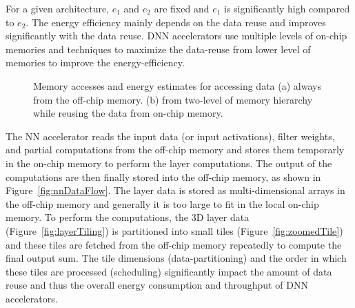 \documentclass[a4paper,10pt]{article}
\begin{document}
For a given architecture, $e_{1}$ and $e_{2}$ are fixed and $e_1$ is significantly high compared to $e_2$. The energy efficiency mainly depends on the data reuse and improves significantly with the data reuse. DNN accelerators use multiple levels of on-chip memories and techniques to maximize the data-reuse from lower level of memories to improve the energy-efficiency. 
\begin{figure}[!htb]
	\centering
	\hfil	
	\hfil	
	\caption{Memory accesses and energy estimates for accessing data (a) always from the off-chip memory. (b) from two-level of memory hierarchy while reusing the data from on-chip memory.}
	\label{fig:memsAccess}
	\vspace{-1.0em}	
\end{figure}

The NN accelerator  reads the input data (or input activations), filter weights, and partial computations from the off-chip memory and stores them temporarly in the on-chip memory to perform the layer computations. The output of the computations are then finally stored into the off-chip memory, as shown in Figure~\ref{fig:nnDataFlow}. The layer data is stored as multi-dimensional arrays in the off-chip memory and generally it is too large to fit in the local on-chip memory. To perform  the computations, the 3D layer data  (Figure~\ref{fig:layerTiling}) is partitioned into small tiles (Figure~\ref{fig:zoomedTile}) and these tiles are fetched from the off-chip memory repeatedly to compute the final output sum. The tile dimensions (data-partitioning) and the order in which these tiles are processed (scheduling) significantly impact the amount of data reuse and thus the overall energy consumption and throughput of DNN accelerators. 
\end{document}
